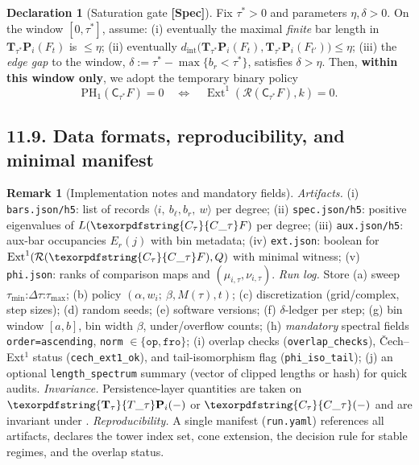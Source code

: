 \documentclass[11pt]{article}
\numberwithin{equation}{section}
\theoremstyle{plain}
\theoremstyle{definition}
\theoremstyle{remark}
\DeclareMathOperator{\Ext}{Ext}
\newcommand{\C}{\mathsf{C}}
\newcommand{\Rfun}{\mathcal{R}}
\theoremstyle{plain}
\theoremstyle{definition}
\numberwithin{equation}{section}
\theoremstyle{definition}
\newtheorem{remark}[theorem]{Remark}
\newtheorem{declaration}[theorem]{Declaration}
\DeclareRobustCommand{\Ttau}{\texorpdfstring{\ensuremath{\mathbf{T}_{\tau}}}{T\_\tau}}
\DeclareRobustCommand{\Ctau}{\texorpdfstring{\ensuremath{C_{\tau}}}{C\_\tau}}
\DeclareRobustCommand{\fqi}{\text{f.q.i.}}
\numberwithin{equation}{section}
\theoremstyle{plain}
\theoremstyle{definition}
\theoremstyle{remark}
\providecommand{\Cfun}[1]{\mathsf{C}_{#1}}
\providecommand{\Tfun}[1]{\mathbf{T}_{#1}}
\providecommand{\Ctau}{\Cfun{\tau}}
\providecommand{\Ttau}{\Tfun{\tau}}
\begin{document}
\begin{declaration}[Saturation gate \textbf{[Spec]}]\label{gate:11-saturation}
Fix $\tau^\ast>0$ and parameters $\eta,\delta>0$. On the window $[0,\tau^\ast]$, assume:
(i) eventually the maximal \emph{finite} bar length in $\mathbf{T}_{\tau^\ast}\mathbf{P}_i(F_t)$ is $\le \eta$;
(ii) eventually $d_{\mathrm{int}}\!\big(\mathbf{T}_{\tau^\ast}\mathbf{P}_i(F_t),\mathbf{T}_{\tau^\ast}\mathbf{P}_i(F_{t'})\big)\le \eta$;
(iii) the \emph{edge gap} to the window, $\delta:=\tau^\ast-\max\{b_r<\tau^\ast\}$, satisfies $\delta>\eta$.
Then, \textbf{within this window only}, we adopt the temporary binary policy
\[
\mathrm{PH}_1(\C_{\tau^\ast}F)=0\quad\Longleftrightarrow\quad \Ext^1(\Rfun(\C_{\tau^\ast}F),k)=0.
\]
\end{declaration}

\subsection*{11.9. Data formats, reproducibility, and minimal manifest}
\begin{remark}[Implementation notes and mandatory fields]\label{rk:11-impl}
\emph{Artifacts.} (i) \texttt{bars.json/h5}: list of records $\langle i,\ b_{\ell},b_{r},\ w\rangle$ per degree; (ii) \texttt{spec.json/h5}: positive eigenvalues of $L(\Ctau F)$ per degree; (iii) \texttt{aux.json/h5}: aux-bar occupancies $E_r(j)$ with bin metadata; (iv) \texttt{ext.json}: boolean for $\Ext^1(\Rfun(\Ctau F),Q)$ with minimal witness; (v) \texttt{phi.json}: ranks of comparison maps and $(\mu_{i,\tau},\nu_{i,\tau})$.
\emph{Run log.} Store (a) sweep $\tau_{\min}$:$\Delta\tau$:$\tau_{\max}$; (b) policy $(\alpha, w_i;\ \beta,M(\tau),t)$; (c) discretization (grid/complex, step sizes); (d) random seeds; (e) software versions; (f) $\delta$-ledger per step; (g) bin window $[a,b]$, bin width $\beta$, under/overflow counts; (h) \emph{mandatory} spectral fields \texttt{order=ascending}, \texttt{norm} $\in\{\texttt{op},\texttt{fro}\}$; (i) overlap checks (\texttt{overlap\_checks}), Čech–Ext$^1$ status (\texttt{cech\_ext1\_ok}), and tail-isomorphism flag (\texttt{phi\_iso\_tail}); (j) an optional \texttt{length\_spectrum} summary (vector of clipped lengths or hash) for quick audits.
\emph{Invariance.} Persistence-layer quantities are taken on $\Ttau\mathbf{P}_i(-)$ or $\Ctau(-)$ and are invariant under \fqi. \emph{Reproducibility.} A single manifest (\texttt{run.yaml}) references all artifacts, declares the tower index set, cone extension, the decision rule for stable regimes, and the overlap status.
\end{remark}
\end{document}
